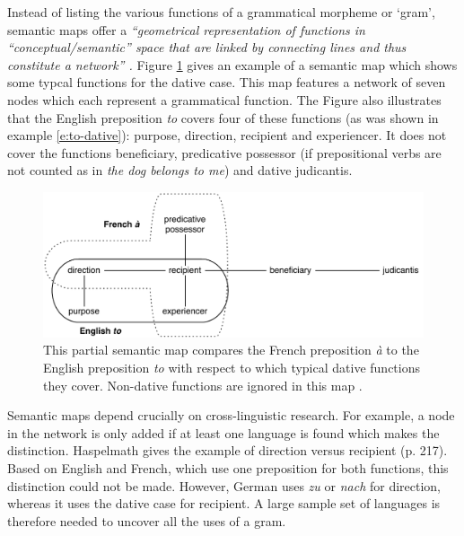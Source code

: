 Instead of listing the various functions of a grammatical morpheme or `gram', semantic maps offer a {\em ``geometrical representation of functions in ``conceptual/semantic'' space that are linked by connecting lines and thus constitute a network'' \citep[p. 213]{haspelmath03geometry}.} Figure \ref{f:semmap-to} gives an example of a semantic map which shows some typcal functions for the dative case. This map features a network of seven nodes which each represent a grammatical function. The Figure also illustrates that the English preposition {\em to} covers four of these functions (as was shown in example \ref{e:to-dative}): purpose, direction, recipient and experiencer. It does not cover the functions beneficiary, predicative possessor (if prepositional verbs are not counted as in {\em the dog belongs to me}) and dative judicantis.
\begin{figure}[t]
\centerline{\includegraphics[width=\textwidth]{Chapter5/figs/semmap-to}}
  \caption[A semantic map of dative functions for {\em to} \citep{haspelmath03geometry}]{This partial semantic map compares the French preposition {\em \`{a}} to the English preposition {\em to} with respect to which typical dative functions they cover. Non-dative functions are ignored in this map \citep[adapted from][figures 8.1 and 8.2, p. 213 and 215]{haspelmath03geometry}.}
   \label{f:semmap-to}
\end{figure}

Semantic maps depend crucially on cross-linguistic research. For example, a node in the network is only added if at least one language is found which makes the distinction. Haspelmath gives the example of direction versus recipient (p. 217). Based on English and French, which use one preposition for
both functions, this distinction could not be made. However, German uses {\em zu} or {\em nach} for direction, whereas it uses the dative case for recipient. A large sample set of languages is therefore needed to uncover all the uses of a gram.

